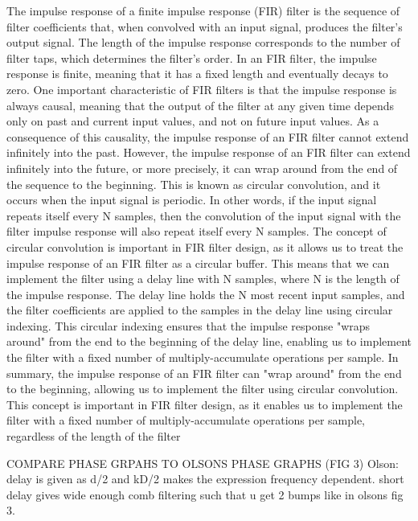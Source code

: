 \documentclass{report}
\begin{document}
            The impulse response of a finite impulse response (FIR) filter is the sequence of filter coefficients that, when convolved with an input signal, produces the filter's output signal.
            The length of the impulse response corresponds to the number of filter taps, which determines the filter's order. In an FIR filter, the impulse response is finite, meaning that it has a fixed length and eventually decays to zero.
            One important characteristic of FIR filters is that the impulse response is always causal, meaning that the output of the filter at any given time depends only on past and current input values, and not on future input values. As a consequence of this causality, the impulse response of an FIR filter cannot extend infinitely into the past.
            However, the impulse response of an FIR filter can extend infinitely into the future, or more precisely, it can wrap around from the end of the sequence to the beginning. This is known as circular convolution, and it occurs when the input signal is periodic. In other words, if the input signal repeats itself every N samples, then the convolution of the input signal with the filter impulse response will also repeat itself every N samples.
            The concept of circular convolution is important in FIR filter design, as it allows us to treat the impulse response of an FIR filter as a circular buffer. This means that we can implement the filter using a delay line with N samples, where N is the length of the impulse response. The delay line holds the N most recent input samples, and the filter coefficients are applied to the samples in the delay line using circular indexing. This circular indexing ensures that the impulse response "wraps around" from the end to the beginning of the delay line, enabling us to implement the filter with a fixed number of multiply-accumulate operations per sample.
            In summary, the impulse response of an FIR filter can "wrap around" from the end to the beginning, allowing us to implement the filter using circular convolution. This concept is important in FIR filter design, as it enables us to implement the filter with a fixed number of multiply-accumulate operations per sample, regardless of the length of the filter

            
            COMPARE PHASE GRPAHS TO OLSONS PHASE GRAPHS (FIG 3)
            Olson:
            delay is given as d/2 and kD/2 makes the expression frequency dependent.
            short delay gives wide enough comb filtering such that u get 2 bumps like in olsons fig 3.
\end{document}
